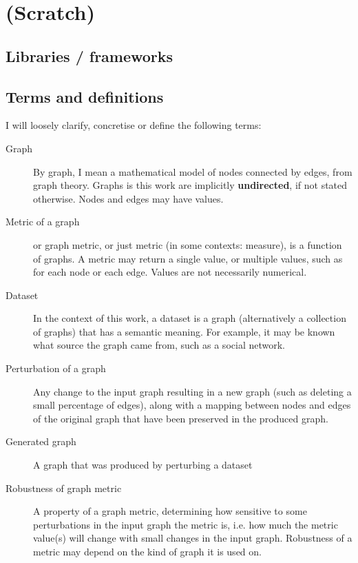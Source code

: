 \chapter{(Scratch)}

\section{Libraries / frameworks}


\section{Terms and definitions}

I will loosely clarify, concretise or define the following terms:

\begin{description}
    \item[Graph]
    By graph, I mean a mathematical model of nodes connected by edges, from graph theory.
    Graphs is this work are implicitly \textbf{undirected}, if not stated otherwise.
    Nodes and edges may have values.

    \item[Metric of a graph]
    or graph metric, or just metric (in some contexts: measure), is a function of graphs.
    A metric may return a single value, or multiple values, such as for each node or each edge.
    Values are not necessarily numerical.

    \item [Dataset]
    In the context of this work, a dataset is a graph (alternatively a collection of graphs) that has a semantic meaning.
    For example, it may be known what source the graph came from, such as a social network.

    \item[Perturbation of a graph]
    Any change to the input graph resulting in a new graph (such as deleting a small percentage of edges), along with a mapping between nodes and edges of the original graph that have been preserved in the produced graph.

    \item[Generated graph]
    A graph that was produced by perturbing a dataset

    \item[Robustness of graph metric]
    A property of a graph metric, determining how sensitive to some perturbations in the input graph the metric is, i.e. how much the metric value(s) will change with small changes in the input graph.
    Robustness of a metric may depend on the kind of graph it is used on.
\end{description}

